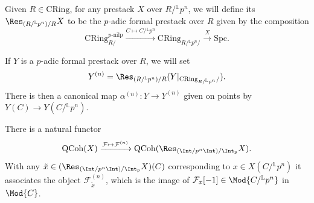 \documentclass[10pt]{amsart}
\begin{document}
\begin{definition}
Given $R\in \mathrm{CRing}$, for any prestack $X$ over $R/{}^{\mathbb{L}}p^n$, we will define its  $\Res_{(R/{}^{\mathbb{L}}p^n)/R}X$ to be the $p$-adic formal prestack over $R$ given by the composition
\[
\mathrm{CRing}^{p\text{-nilp}}_{R/}\xrightarrow{C\mapsto C/{}^{\mathbb{L}}p^n}\mathrm{CRing}_{R/{}^{\mathbb{L}}p^n/}\xrightarrow{X}\mathrm{Spc}.
\]
\end{definition}

\begin{definition}
If $Y$ is a $p$-adic formal prestack over $R$, we will set
\[
Y^{(n)} = \Res_{(R/{}^{\mathbb{L}}p^n)/R}(Y\vert_{\mathrm{CRing}_{R/{}^{\mathbb{L}}p^n}/}).
\]
There is then a canonical map $\alpha^{(n)}:Y\to Y^{(n)}$ given on points by $Y(C)\to Y(C/{}^{\mathbb{L}}p^n)$. 
\end{definition}


\begin{remark}
There is a natural functor 
\[
\mathrm{QCoh}(X)\xrightarrow{\mathcal{F}\mapsto \mathcal{F}^{(n)}} \mathrm{QCoh}(\Res_{(\Int/p^n\Int)/\Int_p}X).
\]
With any $\tilde{x}\in (\Res_{(\Int/p^n\Int)/\Int_p}X)(C)$ corresponding to $x\in X(C/{}^{\mathbb{L}}p^n)$ it associates the object $\mathcal{F}^{(n)}_{\tilde{x}}$, which is the image of $\mathcal{F}_{x}[-1]\in \Mod{C/{}^{\mathbb{L}}p^n}$ in $\Mod{C}$.
\end{remark}
\end{document}
